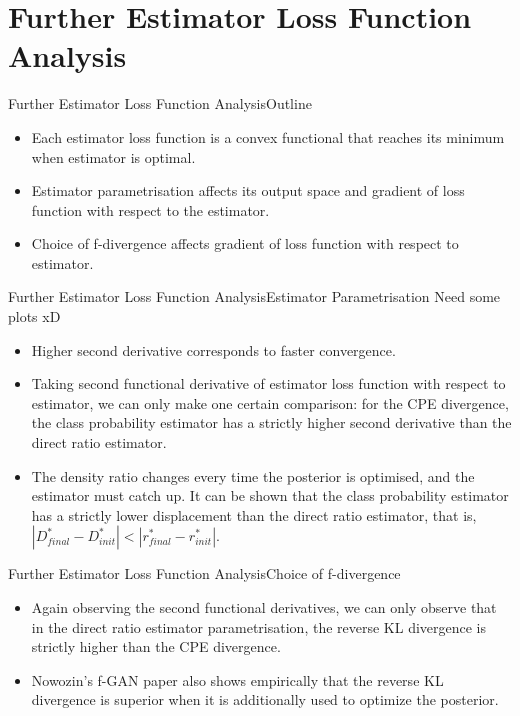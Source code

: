 \documentclass{beamer}
\begin{document}
\section{Further Estimator Loss Function Analysis}
\begin{frame}{Further Estimator Loss Function Analysis}{Outline}
\begin{itemize}
\item Each estimator loss function is a convex functional that reaches its minimum when estimator is optimal.
\item Estimator parametrisation affects its output space and gradient of loss function with respect to the estimator.
\item Choice of f-divergence affects gradient of loss function with respect to estimator.
\end{itemize}
\end{frame}
\begin{frame}{Further Estimator Loss Function Analysis}{Estimator Parametrisation}
Need some plots xD
\begin{itemize}
\item Higher second derivative corresponds to faster convergence.
\item Taking second functional derivative of estimator loss function with respect to estimator, we can only make one certain comparison: for the CPE divergence, the class probability estimator has a strictly higher second derivative than the direct ratio estimator.
\item The density ratio changes every time the posterior is optimised, and the estimator must catch up. It can be shown that the class probability estimator has a strictly lower displacement than the direct ratio estimator, that is, $|D^*_{final}-D^*_{init}|<|r^*_{final}-r^*_{init}|$.
\end{itemize}
\end{frame}
\begin{frame}{Further Estimator Loss Function Analysis}{Choice of f-divergence}
\begin{itemize}
\item Again observing the second functional derivatives, we can only observe that in the direct ratio estimator parametrisation, the reverse KL divergence is strictly higher than the CPE divergence.
\item Nowozin's f-GAN paper also shows empirically that the reverse KL divergence is superior when it is additionally used to optimize the posterior.
\end{itemize}
\end{frame}
\end{document}
